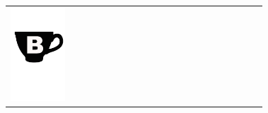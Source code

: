 {\renewcommand{\arraystretch}{1.1}
\begin{center}
\begin{tabular}{ >{\centering\arraybackslash}p{0.18\linewidth}  >{\centering\arraybackslash}p{0.18\linewidth}  >{\centering\arraybackslash}p{0.18\linewidth}  >{\centering\arraybackslash}p{0.18\linewidth}}
\includegraphics[scale=0.021, trim= 0em 25em -5em -5em,]{Icones/icon_cidreB_black.pdf}
&

\end{tabular}
\end{center}}
